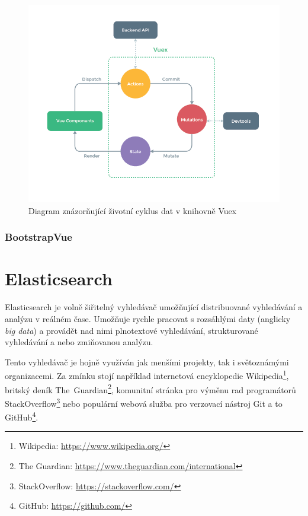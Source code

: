 \begin{figure}[H]
	\centering
	\includegraphics[width=\textwidth]{images/vuex.png}
	\caption{Diagram znázorňující životní cyklus dat v knihovně Vuex}
	\label{vuex-dataflow}
\end{figure}

\blindtext

\subsubsection*{BootstrapVue}
\blindtext

\section{Elasticsearch}
Elasticsearch je volně šiřitelný vyhledávač umožňující distribuované vyhledávání a analýzu v reálném čase. Umožňuje rychle pracovat s rozsáhlými daty (anglicky \emph{big data}) a provádět nad nimi plnotextové vyhledávání, strukturované vyhledávání a nebo zmiňovanou analýzu.

Tento vyhledávač je hojně využíván jak menšími projekty, tak i světoznámými organizacemi. Za zmínku stojí například internetová encyklopedie Wikipedia\footnote{Wikipedia: \url{https://www.wikipedia.org/}}, britský deník The~Guardian\footnote{The Guardian: \url{https://www.theguardian.com/international}}, komunitní stránka pro výměnu rad programátorů StackOverflow\footnote{StackOverflow: \url{https://stackoverflow.com/}} nebo populární webová služba pro verzovací nástroj Git a to GitHub\footnote{GitHub: \url{https://github.com/}}.

